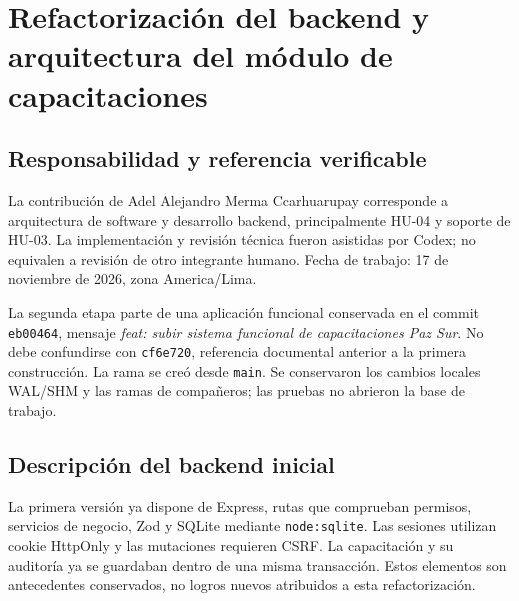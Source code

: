 \chapter{Refactorización del backend y arquitectura del módulo de capacitaciones}
\begingroup
\color{black}
\hypersetup{linkcolor=black,urlcolor=black,citecolor=black}

\section{Responsabilidad y referencia verificable}
La contribución de Adel Alejandro Merma Ccarhuarupay corresponde a arquitectura de software y desarrollo backend, principalmente HU-04 y soporte de HU-03. La implementación y revisión técnica fueron asistidas por Codex; no equivalen a revisión de otro integrante humano. Fecha de trabajo: 17 de noviembre de 2026, zona America/Lima.

La segunda etapa parte de una aplicación funcional conservada en el commit \texttt{eb00464}, mensaje \textit{feat: subir sistema funcional de capacitaciones Paz Sur}. No debe confundirse con \texttt{cf6e720}, referencia documental anterior a la primera construcción. La rama  se creó desde \texttt{main}. Se conservaron los cambios locales WAL/SHM y las ramas de compañeros; las pruebas no abrieron la base de trabajo.

\section{Descripción del backend inicial}
La primera versión ya dispone de Express, rutas que comprueban permisos, servicios de negocio, Zod y SQLite mediante \texttt{node:sqlite}. Las sesiones utilizan cookie HttpOnly y las mutaciones requieren CSRF. La capacitación y su auditoría ya se guardaban dentro de una misma transacción. Estos elementos son antecedentes conservados, no logros nuevos atribuidos a esta refactorización.

